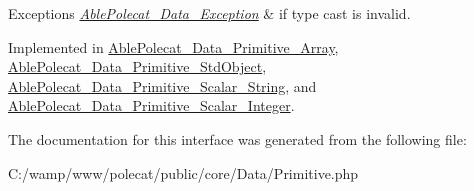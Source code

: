 \begin{DoxyExceptions}{Exceptions}
{\em \hyperlink{class_able_polecat___data___exception}{Able\+Polecat\+\_\+\+Data\+\_\+\+Exception}} & if type cast is invalid. \\
\hline
\end{DoxyExceptions}


Implemented in \hyperlink{class_able_polecat___data___primitive___array_a68640750b79d1cdda3cddcece68a207e}{Able\+Polecat\+\_\+\+Data\+\_\+\+Primitive\+\_\+\+Array}, \hyperlink{class_able_polecat___data___primitive___std_object_a68640750b79d1cdda3cddcece68a207e}{Able\+Polecat\+\_\+\+Data\+\_\+\+Primitive\+\_\+\+Std\+Object}, \hyperlink{class_able_polecat___data___primitive___scalar___string_a68640750b79d1cdda3cddcece68a207e}{Able\+Polecat\+\_\+\+Data\+\_\+\+Primitive\+\_\+\+Scalar\+\_\+\+String}, and \hyperlink{class_able_polecat___data___primitive___scalar___integer_a68640750b79d1cdda3cddcece68a207e}{Able\+Polecat\+\_\+\+Data\+\_\+\+Primitive\+\_\+\+Scalar\+\_\+\+Integer}.



The documentation for this interface was generated from the following file\+:\begin{DoxyCompactItemize}
\item 
C\+:/wamp/www/polecat/public/core/\+Data/Primitive.\+php\end{DoxyCompactItemize}
